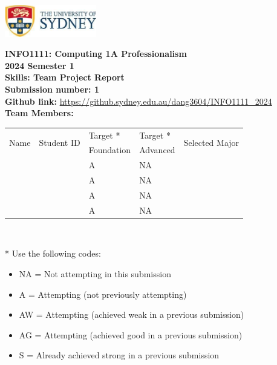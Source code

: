 \documentclass[a4paper, 11pt]{report}
\begin{document}
\begin{titlepage}
\begin{flushright}
\includegraphics[width=4cm]{USyd}\\[1cm]
\end{flushright}

\begin{centering}
\textbf{\huge INFO1111: Computing 1A Professionalism}\\[0.75cm]
\textbf{\huge 2024 Semester 1}\\[2cm]
\textbf{\huge Skills: Team Project Report}\\[2cm]

\textbf{\large Submission number: 1}\\[0.5cm]
\textbf{\large Github link:} \href{https://github.sydney.edu.au/dang3604/INFO1111_2024}{https://github.sydney.edu.au/dang3604/INFO1111_2024}\\[0.75cm]
\textbf{\huge Team Members:}\\[0.75cm]

\begin{tabular}{|p{}|p{}|p{}|p{}|p{}|}
	\hline
	\multirow{2}{*}{Name} & \multirow{2}{*}{Student ID} & Target * & Target * & \multirow{2}{*}{Selected Major} \\
	 & & Foundation & Advanced & \\
	\hline
	\hline
	\raggedright{\studA} & \sidA & A & NA & \majA \\
	\hline
	\raggedright{\studB} & \sidB & A & NA & \majB \\
	\hline
	\raggedright{\studC} & \sidC & A & NA & \majC \\
	\hline
	\raggedright{\studD} & \sidD & A & NA & \majD \\
	\hline
\end{tabular}
\\[0.5cm]
\end{centering}

* Use the following codes:
\begin{itemize}
\setlength\itemsep{0em}
\item NA = Not attempting in this submission
\item A = Attempting (not previously attempting)
\item AW = Attempting (achieved weak in a previous submission) 
\item AG = Attempting (achieved good in a previous submission)
\item S = Already achieved strong in a previous submission
\end{itemize}

\thispagestyle{empty}
\end{titlepage}
\end{document}
